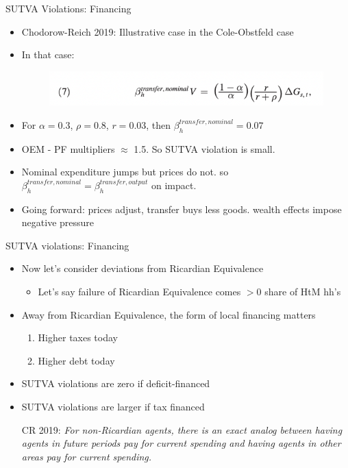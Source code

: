 \documentclass[english,xcolor=svgnames]{beamer}
\begin{document}
\begin{frame}{SUTVA Violations: Financing}
\begin{itemize}
\item Chodorow-Reich 2019: Illustrative case in the Cole-Obstfeld case \\ \begin{footnotesize}{\color{gray}{$\sigma = \eta = \gamma = 1$}} \end{footnotesize}
\item In that case:
\begin{figure}
\includegraphics[scale=0.5]{figures/cr_1}
\end{figure}
\item For $\alpha = 0.3$, $\rho = 0.8$, $r = 0.03$, then $\beta_h^{transfer,nominal} = 0.07$
\item OEM - PF multipliers $\approx$ 1.5. So SUTVA violation is small.
\item Nominal expenditure jumps but prices do not. so $\beta_h^{transfer,nominal}  = \beta_h^{transfer,output}$ on impact.
\item Going forward: prices adjust, transfer buys less goods. wealth effects impose negative pressure \\
\begin{footnotesize}{\color{gray}{SUTVA violation less than 0.07}} \end{footnotesize}

\end{itemize}
\end{frame}


\begin{frame}{SUTVA violations: Financing}
\begin{itemize}
\item Now let's consider deviations from Ricardian Equivalence
\begin{itemize}
\item Let's say failure of Ricardian Equivalence comes $>0$ share of HtM hh's
\end{itemize}
\item Away from Ricardian Equivalence, the form of local financing matters
\begin{enumerate}
\item Higher taxes today
\item Higher debt today
\end{enumerate}
\item SUTVA violations are zero if deficit-financed
\item SUTVA violations are larger if tax financed
\begin{center} CR 2019: \textit{For non-Ricardian agents, there is an exact analog between having agents in future periods pay for current spending and having agents in other areas pay for current spending.}\end{center}
\end{itemize}
\end{frame}
\end{document}
